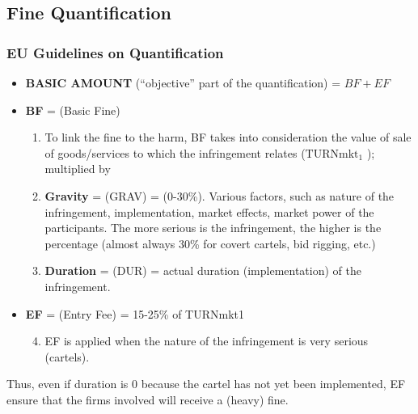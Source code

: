 \newpage
            
    \subsection{Fine Quantification}

        \subsubsection{EU Guidelines on Quantification}

            \begin{itemize}
                \item \textbf{BASIC AMOUNT} (“objective” part of the quantification) = $BF + EF$
                \item \textbf{BF} = (Basic Fine)
                    \begin{enumerate}
                        \item To link the fine to the harm, BF takes into consideration the value of sale of goods/services to which the infringement relates ($\text{TURNmkt}_1$ ); multiplied by
                        \item \textbf{Gravity} = (GRAV) = (0-30\%). Various factors, such as nature of the infringement, implementation, market effects, market power of the participants. The more serious is the infringement, the higher is the percentage (almost always 30\% for covert cartels, bid rigging, etc.)
                        \item \textbf{Duration} = (DUR) = actual duration (implementation) of the infringement.
                    \end{enumerate}
                \item \textbf{EF} = (Entry Fee) = 15-25\% of TURNmkt1
                    \begin{enumerate}
                        \setcounter{enumi}{3}
                        \item EF is applied when the nature of the infringement is very serious (cartels).
                    \end{enumerate}
            \end{itemize}

            Thus, even if duration is 0 because the cartel has not yet been implemented, EF ensure that the firms involved will receive a (heavy) fine.

